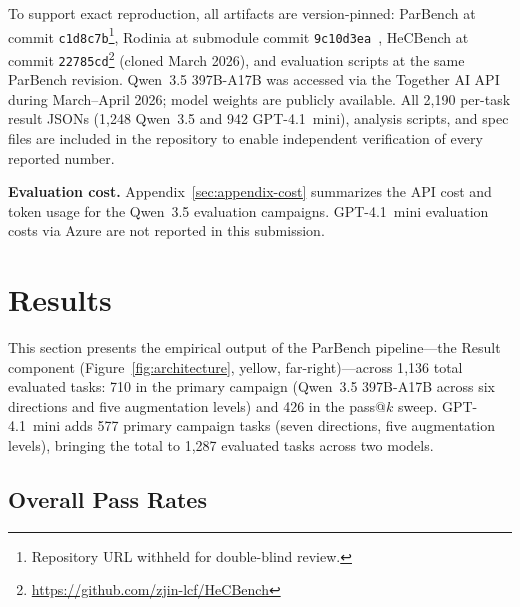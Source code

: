 \documentclass{article}
\begin{document}
To support exact reproduction, all artifacts are version-pinned: ParBench at commit \texttt{c1d8c7b}\footnote{Repository URL withheld for double-blind review.}, Rodinia at submodule commit \texttt{9c10d3ea}~\cite{Rodinia2009}, HeCBench at commit \texttt{22785cd}\footnote{\url{https://github.com/zjin-lcf/HeCBench}} (cloned March 2026), and evaluation scripts at the same ParBench revision. Qwen~3.5 397B-A17B was accessed via the Together AI API during March--April 2026; model weights are publicly available. All 2,190 per-task result JSONs (1,248 Qwen~3.5 and 942 GPT-4.1~mini), analysis scripts, and spec files are included in the repository to enable independent verification of every reported number.

\textbf{Evaluation cost.} Appendix~\ref{sec:appendix-cost} summarizes the API cost and token usage for the Qwen~3.5 evaluation campaigns. GPT-4.1~mini evaluation costs via Azure are not reported in this submission.

\section{Results}
\label{sec:results}

This section presents the empirical output of the ParBench pipeline---the Result component (Figure~\ref{fig:architecture}, yellow, far-right)---across 1{,}136 total evaluated tasks: 710 in the primary campaign (Qwen~3.5 397B-A17B across six directions and five augmentation levels) and 426 in the pass@$k$ sweep. GPT-4.1~mini adds 577 primary campaign tasks (seven directions, five augmentation levels), bringing the total to 1{,}287 evaluated tasks across two models. %

\subsection{Overall Pass Rates}
\label{sec:overall-pass}
\end{document}
